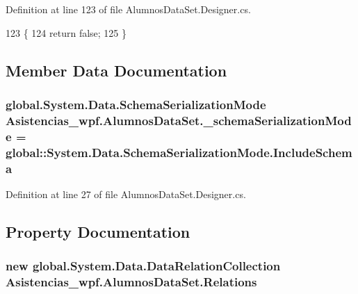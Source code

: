 Definition at line 123 of file Alumnos\-Data\-Set.\-Designer.\-cs.


\begin{DoxyCode}
123                                                         \{
124             \textcolor{keywordflow}{return} \textcolor{keyword}{false};
125         \}
\end{DoxyCode}


\subsection{Member Data Documentation}
\hypertarget{class_asistencias__wpf_1_1_alumnos_data_set_a4e2747d090ad9f5a7cb90cc711d427eb}{
\subsubsection[{\-\_\-schema\-Serialization\-Mode}]{\setlength{\rightskip}{0pt plus 5cm}global.\-System.\-Data.\-Schema\-Serialization\-Mode Asistencias\-\_\-wpf.\-Alumnos\-Data\-Set.\-\_\-schema\-Serialization\-Mode = global\-::\-System.\-Data.\-Schema\-Serialization\-Mode.\-Include\-Schema\hspace{0.3cm}{\ttfamily [private]}}}\label{class_asistencias__wpf_1_1_alumnos_data_set_a4e2747d090ad9f5a7cb90cc711d427eb}


Definition at line 27 of file Alumnos\-Data\-Set.\-Designer.\-cs.



\subsection{Property Documentation}
\hypertarget{class_asistencias__wpf_1_1_alumnos_data_set_a0d4c947f0546161fe211244d255abcf8}{
\subsubsection[{Relations}]{\setlength{\rightskip}{0pt plus 5cm}new global.\-System.\-Data.\-Data\-Relation\-Collection Asistencias\-\_\-wpf.\-Alumnos\-Data\-Set.\-Relations\hspace{0.3cm}{\ttfamily [get]}}}\label{class_asistencias__wpf_1_1_alumnos_data_set_a0d4c947f0546161fe211244d255abcf8}


